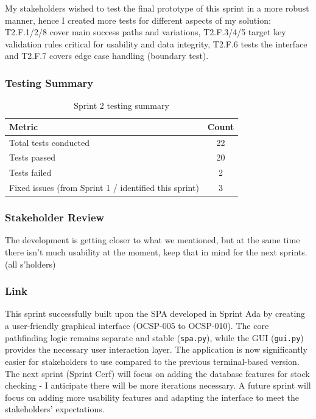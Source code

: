 My stakeholders wished to test the final prototype of this sprint in a more robust manner, hence I created more tests for different aspects of my solution: T2.F.1/2/8 cover main success paths and variations, T2.F.3/4/5 target key validation rules critical for usability and data integrity, T2.F.6 tests the interface and T2.F.7 covers edge case handling (boundary test).

\subsubsection{Testing Summary}
\begin{table}[htbp]
	\centering
	\begin{tabular}{|l|c|}
		\hline
		\textbf{Metric} & \textbf{Count} \\
		\hline
		Total tests conducted & 22 \\ %
		\hline
		Tests passed & 20 \\ %
		\hline
 		Tests failed & 2 \\ %
		\hline
		Fixed issues (from Sprint 1 / identified this sprint) & 3 \\ %
		\hline
	\end{tabular}
	\caption{Sprint 2 testing summary}
\end{table}

\subsubsection{Stakeholder Review}

The development is getting closer to what we mentioned, but at the same time there isn't much usability at the moment, keep that in mind for the next sprints. (all s'holders)

\subsubsection{Link}
This sprint successfully built upon the SPA developed in Sprint Ada by creating a user-friendly graphical interface (OCSP-005 to OCSP-010). The core pathfinding logic remains separate and stable (\verb|spa.py|), while the GUI (\verb|gui.py|) provides the necessary user interaction layer. The application is now significantly easier for stakeholders to use compared to the previous terminal-based version. The next sprint (Sprint Cerf) will focus on adding the database features for stock checking - I anticipate there will be more iterations necessary. A future sprint will focus on adding more usability features and adapting the interface to meet the stakeholders' expectations.

